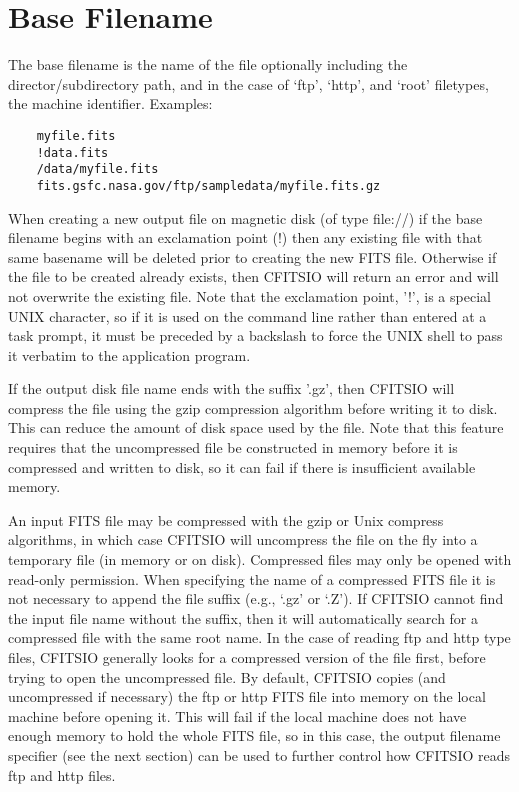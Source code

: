 \documentclass[11pt]{book}
\begin{document}
\section{Base Filename}

The base filename is the name of the file optionally including the
director/subdirectory path, and in the case of `ftp', `http', and `root'
filetypes, the machine identifier.  Examples:

\begin{verbatim}
    myfile.fits
    !data.fits
    /data/myfile.fits
    fits.gsfc.nasa.gov/ftp/sampledata/myfile.fits.gz
\end{verbatim}

When creating a new output file on magnetic disk (of type file://) if
the base filename begins with an exclamation point (!) then any
existing file with that same basename will be deleted prior to creating
the new FITS file.  Otherwise if the file to be created already exists,
then CFITSIO will return an error and will not overwrite the existing
file.  Note  that the exclamation point,  '!', is a special UNIX
character, so if it is used  on the command line rather than entered at
a task prompt, it must be  preceded by a backslash to force the UNIX
shell to pass it verbatim to the application program.

If the output disk file name ends with the suffix '.gz', then CFITSIO
will compress the file using the gzip compression algorithm before
writing it to disk.  This can reduce the amount of disk space used by
the file.  Note that this feature requires that the uncompressed file
be constructed in memory before it is compressed and written to disk,
so it can fail if there is insufficient available memory.

An input FITS file may be compressed with the gzip or Unix compress
algorithms, in which case CFITSIO will uncompress the file on the fly
into a temporary file (in memory or on disk).  Compressed files may
only be opened with read-only permission.  When specifying the name of
a compressed FITS file it is not necessary to append the file suffix
(e.g., `.gz' or `.Z').  If CFITSIO cannot find the input file name
without the suffix, then it will automatically search for a compressed
file with the same root name.  In the case of reading ftp and http type
files, CFITSIO generally looks for a compressed version of the file
first, before trying to open the uncompressed file.  By default,
CFITSIO copies (and uncompressed if necessary) the ftp or http FITS
file into memory on the local machine before opening it.  This will
fail if the local machine does not have enough memory to hold the whole
FITS file, so in this case, the output filename specifier (see the next
section) can be used to further control how CFITSIO reads ftp and http
files.
\end{document}
